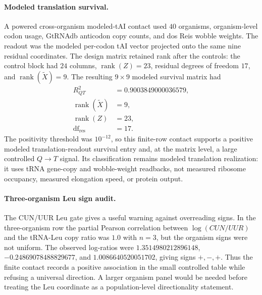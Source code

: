 \paragraph{Modeled translation survival.}
A powered cross-organism modeled-tAI contact used $40$ organisms, organism-level codon usage, GtRNAdb anticodon copy counts, and dos Reis wobble weights. The readout was the modeled per-codon tAI vector projected onto the same nine residual coordinates. The design matrix retained rank after the controls: the control block had $24$ columns, $\operatorname{rank}(Z)=23$, residual degrees of freedom $17$, and $\operatorname{rank}(\widetilde X)=9$. The resulting $9\times 9$ modeled survival matrix had
$$
\begin{aligned}
R^2_{QT} &= 0.9003849000036579,\\
\operatorname{rank}(\widetilde X) &= 9,\\
\operatorname{rank}(Z) &= 23,\\
\operatorname{df}_{\mathrm{res}} &= 17.
\end{aligned}
$$
The positivity threshold was $10^{-12}$, so this finite-row contact supports a positive modeled translation-readout survival entry and, at the matrix level, a large controlled $Q\to T$ signal. Its classification remains modeled translation realization: it uses tRNA gene-copy and wobble-weight readbacks, not measured ribosome occupancy, measured elongation speed, or protein output.

\paragraph{Three-organism Leu sign audit.}
The CUN/UUR Leu gate gives a useful warning against overreading signs. In the three-organism row the partial Pearson correlation between $\log(CUN/UUR)$ and the tRNA-Leu copy ratio was $1.0$ with $n=3$, but the organism signs were not uniform. The observed log-ratios were $1.3514980212896148$, $-0.24869078488829677$, and $1.0086640520051702$, giving signs $+,-,+$. Thus the finite contact records a positive association in the small controlled table while refusing a universal direction. A larger organism panel would be needed before treating the Leu coordinate as a population-level directionality statement.


